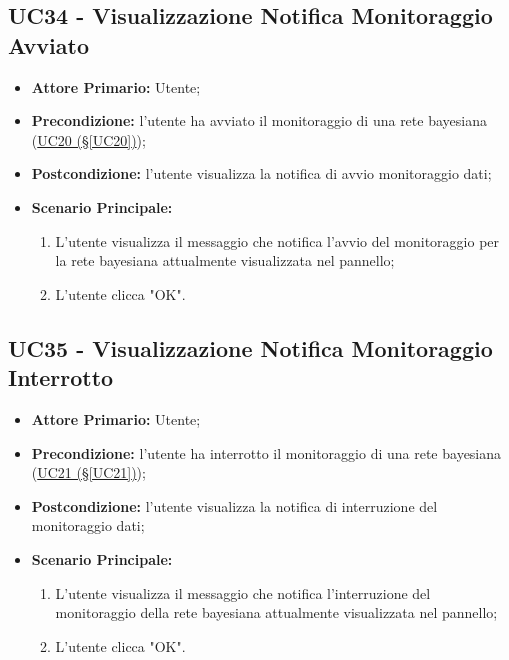 \pagebreak

\subsection{UC34 - Visualizzazione Notifica Monitoraggio Avviato}\label{UC34}

\begin{itemize}
	\item \textbf{Attore Primario:} Utente;
	\item \textbf{Precondizione:} l'utente ha avviato il monitoraggio di una rete bayesiana (\hyperref[UC20]{UC20 (§\ref*{UC20})});
	\item \textbf{Postcondizione:} l'utente visualizza la notifica di avvio monitoraggio dati;
	\item \textbf{Scenario Principale:}
	\begin{enumerate}
		\item L'utente visualizza il messaggio che notifica l'avvio del monitoraggio per la rete bayesiana attualmente visualizzata nel pannello;
		\item L'utente clicca "OK".
	\end{enumerate}
\end{itemize}

\pagebreak

\subsection{UC35 - Visualizzazione Notifica Monitoraggio Interrotto}\label{UC35}

\begin{itemize}
	\item \textbf{Attore Primario:} Utente;
	\item \textbf{Precondizione:} l'utente ha interrotto il monitoraggio di una rete bayesiana (\hyperref[UC21]{UC21 (§\ref*{UC21})});
	\item \textbf{Postcondizione:} l'utente visualizza la notifica di interruzione del monitoraggio dati;
	\item \textbf{Scenario Principale:}
	\begin{enumerate}
		\item L'utente visualizza il messaggio che notifica l'interruzione del monitoraggio della rete bayesiana attualmente visualizzata nel pannello;
		\item L'utente clicca "OK".
	\end{enumerate}
\end{itemize}

